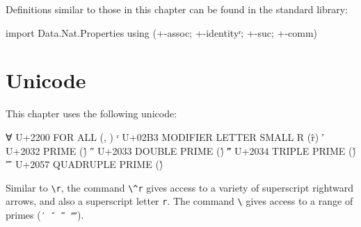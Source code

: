 Definitions similar to those in this chapter can be found in the
standard library:

\begin{fence}
\begin{code}
import Data.Nat.Properties using (+-assoc; +-identityʳ; +-suc; +-comm)
\end{code}
\end{fence}

\hypertarget{unicode}{%
\section{Unicode}\label{unicode}}

This chapter uses the following unicode:

\begin{myDisplay}
∀  U+2200  FOR ALL (\forall, \all)
ʳ  U+02B3  MODIFIER LETTER SMALL R (\^r)
′  U+2032  PRIME (\')
″  U+2033  DOUBLE PRIME (\')
‴  U+2034  TRIPLE PRIME (\')
⁗  U+2057  QUADRUPLE PRIME (\')
\end{myDisplay}

Similar to \texttt{\textbackslash{}r}, the command
\texttt{\textbackslash{}\^{}r} gives access to a variety of superscript
rightward arrows, and also a superscript letter \texttt{r}. The command
\texttt{\textbackslash{}\textquotesingle{}} gives access to a range of
primes (\texttt{′\ ″\ ‴\ ⁗}).

